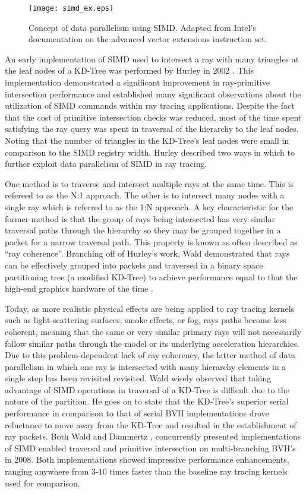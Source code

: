 \begin{figure}
  \centering
  \texttt{[image: simd\_ex.eps]}
  \caption{Concept of data parallelism using SIMD. Adapted from Intel's
    documentation on the advanced vector extensions instruction
    set. \cite{Intel_AVX}}
  \label{fig:simd}
\end{figure}

An early implementation of SIMD used to intersect a ray with many triangles at
the leaf nodes of a KD-Tree was performed by Hurley in 2002
\cite{Hurley_2002}. This implementation demonstrated a significant improvement in
ray-primitive intersection performance and established many significant
observations about the utilization of SIMD commands within ray tracing
applications. Despite the fact that the cost of primitive intersection checks
was reduced, most of the time spent satisfying the ray query was spent in
traversal of the hierarchy to the leaf nodes. Noting that the number of
triangles in the KD-Tree's leaf nodes were small in comparison to the SIMD
registry width, Hurley described two ways in which to further exploit data
parallelism of SIMD in ray tracing.

One method is to traverse and intersect multiple rays at the same time. This is
refereed to as the N:1 approach. The other is to intersect many nodes with a
single ray which is referred to as the 1:N approach. A key characteristic for
the former method is that the group of rays being intersected has very similar
traversal paths through the hierarchy so they may be grouped together in a
packet for a narrow traversal path. This property is known as often described as
``ray coherence''. Branching off of Hurley's work, Wald demonstrated that rays
can be effectively grouped into packets and traversed in a binary space
partitioning tree (a modified KD-Tree) to achieve performance equal to that the
high-end graphics hardware of the time \cite{Wald_2001}.

Today, as more realistic physical effects are being applied to ray tracing
kernels such as light-scattering surfaces, smoke effects, or fog, rays paths
become less coherent, meaning that the same or very similar primary rays will
not necessarily follow similar paths through the model or its underlying
acceleration hierarchies. Due to this problem-dependent lack of ray coherency,
the latter method of data parallelism in which one ray is intersected with many
hierarchy elements in a single step has been revisited revisited. Wald wisely
observed that taking advantage of SIMD operations in traversal of a KD-Tree is
difficult due to the nature of the partition. He goes on to state that the
KD-Tree's superior serial performance in comparison to that of serial BVH
implementations drove reluctance to move away from the KD-Tree and resulted in
the establishment of ray packets. \cite{Wald_2008} Both Wald and Dammertz
\cite{Dammertz_2008}, concurrently presented implementations of SIMD enabled
traversal and primitive intersection on multi-branching BVH's in 2008. Both
implementations showed impressive performance enhancements, ranging anywhere
from 3-10 times faster than the baseline ray tracing kernels used for
comparison.

